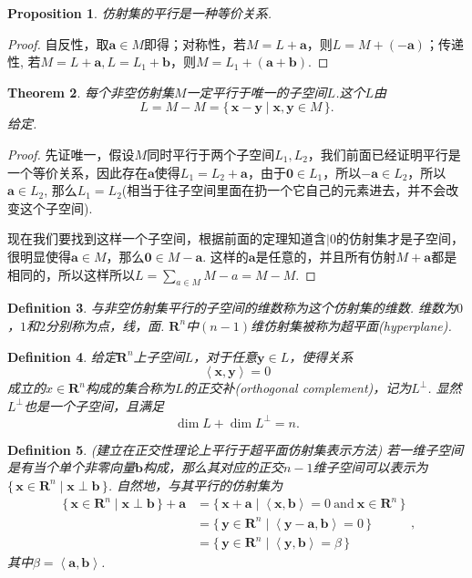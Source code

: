 \documentclass{article}
\newtheorem{theorem}{Theorem}[section]
\newtheorem{proposition}[theorem]{Proposition}
\newtheorem{definition}[theorem]{Definition}
\newcommand\Set[2]{\{\,#1\mid#2\,\}} %
\newcommand{\vect}[1]{\mathbf{#1}} %
\newcommand{\thereal}{\mathbf{R}} %
\newcommand{\inprod}[2]{\left<#1,#2\right>} %
\begin{document}
\begin{proposition}
\rm 仿射集的平行是一种{\color{red}等价关系}.
\end{proposition}

\begin{proof}
自反性，取$\vect{a} \in M$即得；对称性，若$M = L + \vect{a}$，则$L = M + (-\vect{a})$；传递性, 若$M = L + \vect{a},L = L_1 + \vect{b}$，则$M = L_1 + (\vect{a}+\vect{b})$.
\end{proof}

\begin{theorem}
\rm 每个非空仿射集$M$一定平行于唯一的子空间$L$.这个$L$由
$$
L = M-M = \Set{\vect{x}-\vect{y}}{\vect{x},\vect{y} \in M}.
$$
给定.
\end{theorem}

\begin{proof}
先证{\color{blue}唯一}，假设$M$同时平行于两个子空间$L_1,L_2$，我们前面已经证明平行是一个等价关系，因此存在$\vect{a}$使得$L_1 = L_2 + \vect{a}$，由于$\vect{0} \in L_1$，所以$\vect{-a} \in L_2$，所以$\vect{a} \in L_2$, 那么$L_1 = L_2$(相当于往子空间里面在扔一个它自己的元素进去，并不会改变这个子空间). 

现在我们要{\color{blue}找到这样一个子空间}，根据前面的定理知道含$\vert{0}$的仿射集才是子空间，很明显使得$\vect{a} \in M$，那么$\vect{0} \in M-\vect{a}$. 这样的$\vect{a}$是任意的，并且所有仿射$M+\vect{a}$都是相同的，所以这样所以$L =\sum_{a \in M} M-a = M-M$.
\end{proof}

\begin{definition}
\rm 与非空仿射集平行的子空间的维数称为这个仿射集的{\color{red}维数}. 维数为$0$，$1$和$2$分别称为点，线，面. $\thereal^n$中$(n-1)$维仿射集被称为{\color{red}超平面}(hyperplane).
\end{definition}

\begin{definition}
\rm 给定$\thereal^n$上子空间$L$，对于任意$\vect{y} \in L$，使得关系
$$
\inprod{\vect{x}}{\vect{y}} = 0
$$
成立的$x \in \thereal^n$构成的集合称为$L$的{\color{red}正交补}(orthogonal complement)，记为$L^\perp$. 显然$L^\perp$也是一个子空间，且满足
$$
\dim L + \dim L^\perp = n.
$$
\end{definition}

\begin{definition}
\rm {\color{red} (建立在正交性理论上平行于超平面仿射集表示方法)} 若一维子空间是有当个单个非零向量$\vect{b}$构成，那么其对应的正交$n-1$维子空间可以表示为$\Set{\vect{x} \in \thereal^n}{\vect{x} \perp \vect{b}}$. 自然地，与其平行的仿射集为
$$
\begin{array}{ll}
\Set{\vect{x} \in \thereal^n}{\vect{x} \perp \vect{b}} + \vect{a} &= \Set{\vect{x}+\vect{a}}{\inprod{\vect{x}}{\vect{b}}=0~\text{and}~\vect{x} \in \thereal^{n}} \\
&= \Set{\vect{y} \in \thereal^{n}}{\inprod{\vect{y}-\vect{a}}{\vect{b}}=0} \\
&= \Set{\vect{y} \in \thereal^{n}}{\inprod{\vect{y}}{\vect{b}}=\beta} 
\end{array},
$$
其中$\beta = \inprod{\vect{a}}{\vect{b}}$.
\end{definition}
\end{document}
